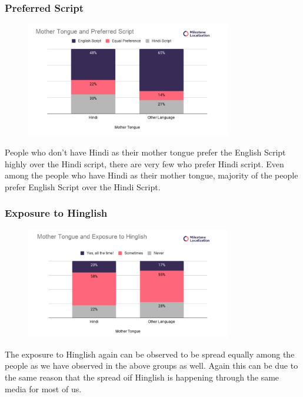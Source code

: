 \documentclass{article}
\begin{document}
\subsubsection{Preferred Script}

\begin{figure}[H]
    \centering
    \includegraphics[width=0.8\textwidth]{plots/mother_preferred_script.png}
\end{figure}

People who don't have Hindi as their mother tongue prefer the English Script highly over the Hindi script, there are very few who prefer Hindi script. Even among the people who have Hindi as their mother tongue, majority of the people prefer English Script over the Hindi Script. 


\subsubsection{Exposure to Hinglish}

\begin{figure}[H]
    \centering
    \includegraphics[width=0.8\textwidth]{plots/mother_exposure.png}
\end{figure}

The exposure to Hinglish again can be observed to be spread equally among the people as we have observed in the above groups as well. Again this can be due to the same reason that the spread oif Hinglish is happening through the same media for most of us.
\end{document}
